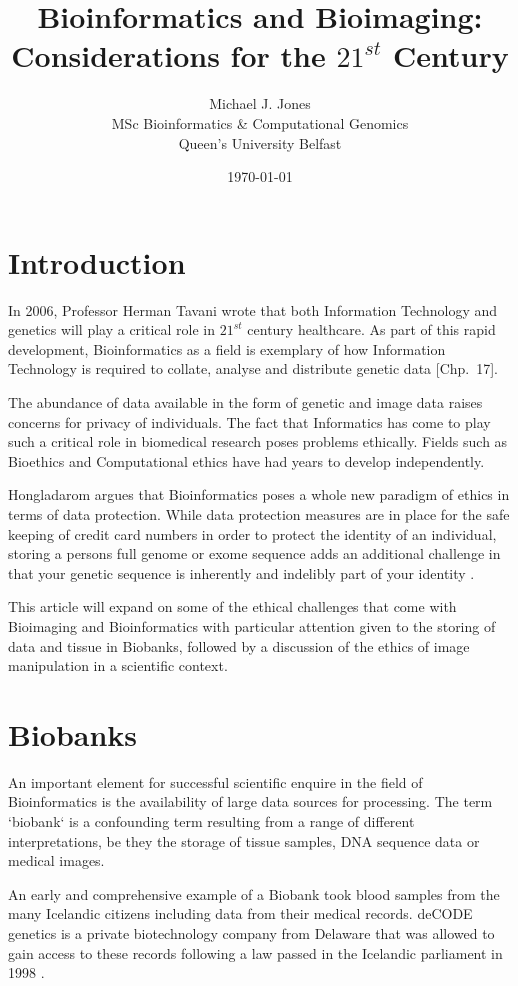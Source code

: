 \documentclass[british,a4paper, 12pt]{article}
\title{Bioinformatics and Bioimaging: Considerations for the $21^{st}$ Century}
\author{Michael J. Jones \\
  MSc Bioinformatics \& Computational Genomics \\
  Queen's University Belfast}
\date{\today}
\begin{document}
\maketitle

\section{Introduction}
In 2006, Professor Herman Tavani wrote that both Information Technology and
genetics will play a critical role in $21^{st}$ century healthcare. As part of
this rapid development, Bioinformatics as a field is exemplary of how
Information Technology is required to collate, analyse and distribute genetic
data \parencite{tavani2006ethics}[Chp.~17].

The abundance of data available in the form of genetic and image data raises
concerns for privacy of individuals. The fact that Informatics has come to
play such a critical role in biomedical research poses problems ethically.
Fields such as Bioethics and Computational ethics have had years to develop
independently.

Hongladarom argues that Bioinformatics poses a whole new paradigm of ethics in
terms of data protection. While data protection measures are in place for the
safe keeping of credit card numbers in order to protect the identity of an
individual, storing a persons full genome or exome sequence adds an additional
challenge in that your genetic sequence is inherently and indelibly part of
your identity \parencite{hongladarom2006ethics}.

This article will expand on some of the ethical challenges that come with
Bioimaging and Bioinformatics with particular attention given to the storing
of data and tissue in Biobanks, followed by a discussion of the ethics of
image manipulation in a scientific context.

\section{Biobanks}
An important element for successful scientific enquire in the field of
Bioinformatics is the availability of large data sources for processing. The
term `biobank` is a confounding term resulting from a range of different
interpretations, be they the storage of tissue samples, DNA sequence data or
medical images.

An early and comprehensive example of a Biobank took blood samples from the
many Icelandic citizens including data from their medical records. deCODE
genetics is a private biotechnology company from Delaware that was allowed to
gain access to these records following a law passed in the Icelandic parliament
in 1998 \parencite{chadwick1999icelandic}.
\end{document}
